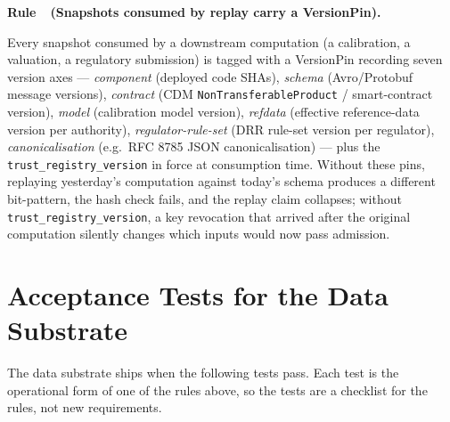 \documentclass[11pt,a4paper]{article}
\newcounter{rul}
\newenvironment{rul}[1]{%
  \refstepcounter{rul}\par\medskip\noindent\textbf{Rule~\therul\ (#1).}\ %
}{\par\medskip}
\begin{document}
\begin{rul}{Snapshots consumed by replay carry a VersionPin}
Every snapshot consumed by a downstream computation (a calibration, a valuation, a regulatory submission) is tagged with a VersionPin recording seven version axes --- \emph{component} (deployed code SHAs), \emph{schema} (Avro/Protobuf message versions), \emph{contract} (CDM \texttt{NonTransferableProduct} / smart-contract version), \emph{model} (calibration model version), \emph{refdata} (effective reference-data version per authority), \emph{regulator-rule-set} (DRR rule-set version per regulator), \emph{canonicalisation} (e.g.\ RFC 8785 JSON canonicalisation) --- plus the \texttt{trust\_registry\_version} in force at consumption time. Without these pins, replaying yesterday's computation against today's schema produces a different bit-pattern, the hash check fails, and the replay claim collapses; without \texttt{trust\_registry\_version}, a key revocation that arrived after the original computation silently changes which inputs would now pass admission.
\end{rul}

\section{Acceptance Tests for the Data Substrate}

The data substrate ships when the following tests pass. Each test is the operational form of one of the rules above, so the tests are a checklist for the rules, not new requirements.
\end{document}
